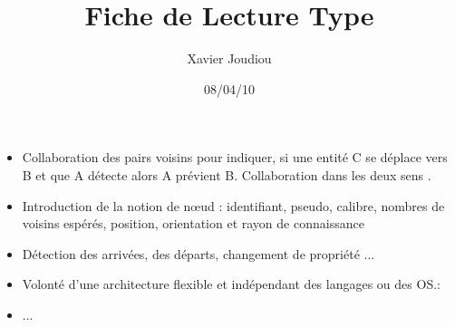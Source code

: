 \documentclass[11pt,a4paper]{article}
\title{Fiche de Lecture Type}
\author{Xavier Joudiou}
\date{08/04/10}
\begin{document}
	
  \begin{itemize}
  \renewcommand{\labelitemi}{$\Rightarrow$}
	\item Collaboration des pairs voisins pour indiquer, si une entité C se déplace vers B et que A détecte alors A prévient B. Collaboration dans les deux sens .
	\item Introduction de la notion de nœud : identifiant, pseudo, calibre, nombres de voisins espérés, position, orientation et rayon de connaissance
	\item Détection des arrivées, des départs, changement de propriété ...
	\item Volonté d'une architecture flexible et indépendant des langages ou des OS.:
	\item ...
  \end{itemize}
\end{document}
